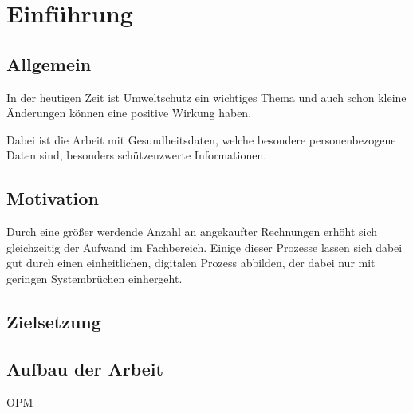 
\section{Einführung}
\subsection{Allgemein}
In der heutigen Zeit ist Umweltschutz ein wichtiges Thema
und auch schon kleine Änderungen können eine positive Wirkung haben.

Dabei ist die Arbeit mit Gesundheitsdaten, welche besondere personenbezogene Daten sind,
besonders schützenzwerte Informationen. %
\subsection{Motivation}
Durch eine größer werdende Anzahl an angekaufter Rechnungen erhöht sich gleichzeitig der Aufwand im Fachbereich.
Einige dieser Prozesse lassen sich dabei gut durch einen einheitlichen, digitalen Prozess abbilden,
der dabei nur mit geringen Systembrüchen einhergeht.

\subsection{Zielsetzung}
\subsection{Aufbau der Arbeit}


\acrfull{OPM}
\clearpage